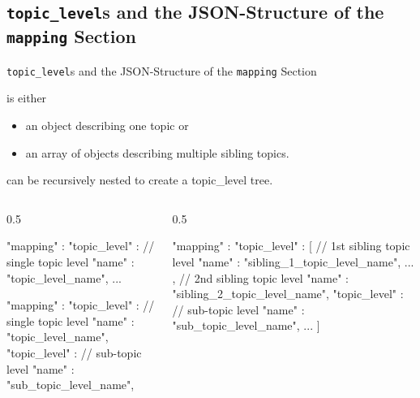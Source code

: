 ﻿\subsection[nosectionpage]{\texttt{\alert{topic\_level}}s and the JSON-Structure of the \alert{\texttt{mapping}} Section}

\begin{frame}[fragile]{\alert{\texttt{topic\_level}}s and the JSON-Structure of the \alert{\texttt{mapping}} Section}
  \begin{description}
    \item[topic\_level] is either
    \begin{itemize}
      \item an \alert{object} describing one topic or
      \item an \alert{array of objects} describing multiple \alert{sibling} topics.
    \end{itemize}
    \item[topic\_levels] can be recursively nested to create a \alert{topic\_level tree}.
  \end{description}
\begin{columns}[]
  \begin{column}{0.5\textwidth}
  \begin{jsoncode}[autogobble=true]
      "mapping" : {
          "topic_level" : {         // single topic level
              "name" : "topic_level_name",
              ...
          }
      }
  \end{jsoncode}
  \begin{jsoncode}[autogobble=true]
      "mapping" : {
          "topic_level" : {         // single topic level
              "name" : "topic_level_name",
              "topic_level" : {     // sub-topic level
                  "name" : "sub_topic_level_name",
              }
          }
      }
  \end{jsoncode}
  \end{column}
  \begin{column}{0.5\textwidth}
  \begin{jsoncode}[autogobble=true]
      "mapping" : {
          "topic_level" : [{     // 1st sibling topic level
              "name" : "sibling_1_topic_level_name",
              ...
          }, {                   // 2nd sibling topic level
              "name" : "sibling_2_topic_level_name",
              "topic_level" : {  // sub-topic level
                  "name" : "sub_topic_level_name",
                  ...
              }
          }]
      }
  \end{jsoncode}
  \end{column}
\end{columns}
\end{frame}

